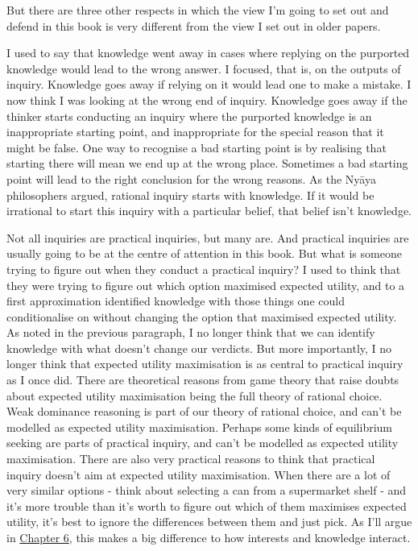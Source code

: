 \documentclass[
  10pt,
  letterpaper,
  twoside]{scrbook}
\begin{document}
But there are three other respects in which the view I'm going to set
out and defend in this book is very different from the view I set out in
older papers.

I used to say that knowledge went away in cases where replying on the
purported knowledge would lead to the wrong answer. I focused, that is,
on the outputs of inquiry. Knowledge goes away if relying on it would
lead one to make a mistake. I now think I was looking at the wrong end
of inquiry. Knowledge goes away if the thinker starts conducting an
inquiry where the purported knowledge is an inappropriate starting
point, and inappropriate for the special reason that it might be false.
One way to recognise a bad starting point is by realising that starting
there will mean we end up at the wrong place. Sometimes a bad starting
point will lead to the right conclusion for the wrong reasons. As the
Nyāya philosophers argued, rational inquiry starts with knowledge. If it
would be irrational to start this inquiry with a particular belief, that
belief isn't knowledge.

Not all inquiries are practical inquiries, but many are. And practical
inquiries are usually going to be at the centre of attention in this
book. But what is someone trying to figure out when they conduct a
practical inquiry? I used to think that they were trying to figure out
which option maximised expected utility, and to a first approximation
identified knowledge with those things one could conditionalise on
without changing the option that maximised expected utility. As noted in
the previous paragraph, I no longer think that we can identify knowledge
with what doesn't change our verdicts. But more importantly, I no longer
think that expected utility maximisation is as central to practical
inquiry as I once did. There are theoretical reasons from game theory
that raise doubts about expected utility maximisation being the full
theory of rational choice. Weak dominance reasoning is part of our
theory of rational choice, and can't be modelled as expected utility
maximisation. Perhaps some kinds of equilibrium seeking are parts of
practical inquiry, and can't be modelled as expected utility
maximisation. There are also very practical reasons to think that
practical inquiry doesn't aim at expected utility maximisation. When
there are a lot of very similar options - think about selecting a can
from a supermarket shelf - and it's more trouble than it's worth to
figure out which of them maximises expected utility, it's best to ignore
the differences between them and just pick. As I'll argue in
\hyperref[sec-ties]{Chapter 6}, this makes a big difference to how
interests and knowledge interact.
\end{document}
